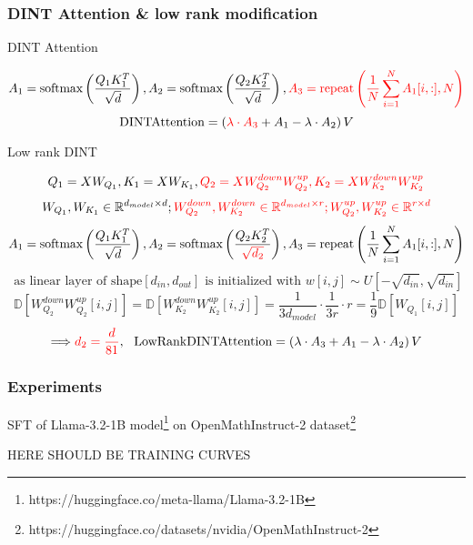 \documentclass[10pt]{beamer}
\begin{document}
\begin{frame}
    \frametitle{DINT Attention \& low rank modification}

    \begin{block}{DINT Attention}
        \vspace{-0.5cm}
        
        $$A_1 = \text{softmax}\left(\frac{Q_1 K_1^T}{\sqrt{d}}\right), A_2 = \text{softmax}\left(\frac{Q_2 K_2^T}{\sqrt{d}}\right), \textcolor{red}{A_3 = \text{repeat}\left(\frac{1}{N}\sum\limits_{i=1}^{N}A_1[i,:], N\right)}$$
        $$\text{DINTAttention} = \left(\textcolor{red}{\lambda\cdot A_3} + A_1 - \lambda\cdot A_2 \right) V$$

    \end{block}

    \begin{block}{Low rank DINT}
        \vspace{-0.5cm}

        $$Q_1 = X W_{Q_1}, K_1 = X W_{K_1}, \textcolor{red}{Q_2 = XW_{Q_2}^{down} W_{Q_2}^{up}, K_2 = XW_{K_2}^{down} W_{K_2}^{up}}$$
        $$W_{Q_1}, W_{K_1} \in \mathbb{R}^{d_{model} \times d}; \textcolor{red}{W_{Q_2}^{down}, W_{K_2}^{down} \in \mathbb{R}^{d_{model} \times r}; W_{Q_2}^{up}, W_{K_2}^{up} \in \mathbb{R}^{r \times d}} $$
        $$A_1 = \text{softmax}\left(\frac{Q_1 K_1^T}{\sqrt{d}}\right), A_2 = \text{softmax}\left(\frac{Q_2 K_2^T}{\textcolor{red}{\sqrt{d_2}}}\right), A_3 = \text{repeat}\left(\frac{1}{N}\sum\limits_{i=1}^{N}A_1[i,:], N\right)$$
        $$\text{ as linear layer of shape} [d_{in}, d_{out}] \text{ is initialized with } w[i,j] \sim U[-\sqrt{d_{in}}, \sqrt{d_{in}}]$$ $$\mathbb{D}[W_{Q_2}^{down} W_{Q_2}^{up}[i,j]] = \mathbb{D}[W_{K_2}^{down} W_{K_2}^{up}[i,j]] = \frac{1}{3 d_{model}}\cdot \frac{1}{3 r}\cdot r = \frac{1}{9}\mathbb{D}[W_{Q_1}[i,j]]$$
        $$\Longrightarrow \textcolor{red}{d_2 = \frac{d}{81}},~~ \text{LowRankDINTAttention} = \left(\lambda\cdot A_3 + A_1 - \lambda\cdot A_2 \right) V$$

    \end{block}
        
\end{frame}


\begin{frame}
    \frametitle{Experiments}
    SFT of Llama-3.2-1B model\footnote{https://huggingface.co/meta-llama/Llama-3.2-1B} on OpenMathInstruct-2 dataset\footnote{https://huggingface.co/datasets/nvidia/OpenMathInstruct-2}
    \begin{center}
        HERE SHOULD BE TRAINING CURVES
    \end{center}
        
\end{frame}
\end{document}
